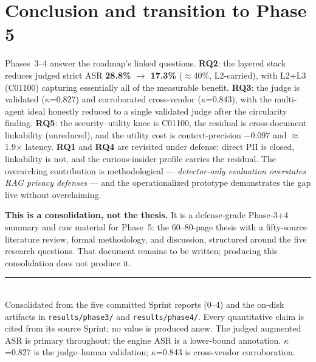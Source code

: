 \documentclass[11pt,a4paper]{article}
\newcommand{\kp}{\ensuremath{\kappa}}
\newcommand{\code}[1]{\texttt{\small #1}}
\begin{document}
\section{Conclusion and transition to Phase 5}

Phases~3--4 answer the roadmap's linked questions. \textbf{RQ2}: the layered stack reduces judged strict
ASR \textbf{28.8\% $\to$ 17.3\%} ($\approx$40\%, L2-carried), with L2+L3 (C01100) capturing essentially
all of the measurable benefit. \textbf{RQ3}: the judge is validated (\kp{}=0.827) and corroborated
cross-vendor (\kp{}=0.843), with the multi-agent ideal honestly reduced to a single validated judge
after the circularity finding. \textbf{RQ5}: the security--utility knee is C01100, the residual is
cross-document linkability (unreduced), and the utility cost is context-precision $-0.097$ and
$\approx$1.9$\times$ latency. \textbf{RQ1} and \textbf{RQ4} are revisited under defense: direct PII is
closed, linkability is not, and the curious-insider profile carries the residual. The overarching
contribution is methodological --- \emph{detector-only evaluation overstates RAG privacy defenses} ---
and the operationalized prototype demonstrates the gap live without overclaiming.

\noindent\textbf{This is a consolidation, not the thesis.} It is a defense-grade Phase-3+4 summary and
raw material for Phase~5: the 60--80-page thesis with a fifty-source literature review, formal
methodology, and discussion, structured around the five research questions. That document remains to be
written; producing this consolidation does not produce it.

\vfill
\noindent\rule{\textwidth}{0.4pt}\\
{\footnotesize Consolidated from the five committed Sprint reports (0--4) and the on-disk artifacts in
\code{results/phase3/} and \code{results/phase4/}. Every quantitative claim is cited from its source
Sprint; no value is produced anew. The judged augmented ASR is primary throughout; the engine ASR is a
lower-bound annotation. \kp{}=0.827 is the judge--human validation; \kp{}=0.843 is cross-vendor
corroboration.}
\end{document}
